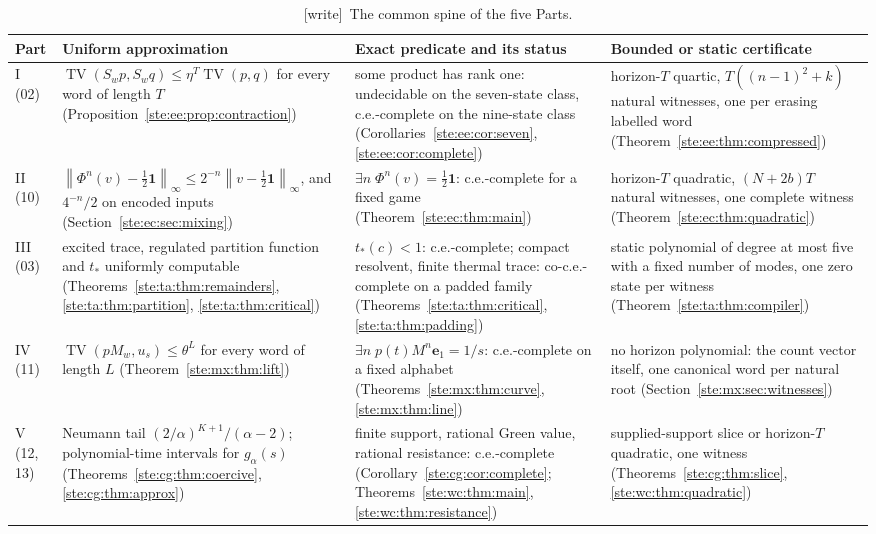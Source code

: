 \documentclass[11pt,letterpaper]{article}
\theoremstyle{definition}
\theoremstyle{remark}
\newcommand{\one}{\mathbf 1}
\newcommand{\TV}{\operatorname{TV}}
\newcommand{\norm}[1]{\left\lVert #1\right\rVert}
\newcommand{\e}{\mathbf e}
\newcommand{\wtag}{\textup{[write]}}
\begin{document}
\begin{table}[ht]
\centering\small
\begin{tabular}{@{}L{0.09\textwidth}L{0.27\textwidth}L{0.27\textwidth}L{0.29\textwidth}@{}}
\toprule
Part & Uniform approximation & Exact predicate and its status & Bounded or static certificate\\
\midrule
I (02) & $\TV(S_wp,S_wq)\le\eta^T\TV(p,q)$ for every word of length $T$ (Proposition~\ref{ste:ee:prop:contraction}) & some product has rank one: undecidable on the seven-state class, c.e.-complete on the nine-state class (Corollaries~\ref{ste:ee:cor:seven}, \ref{ste:ee:cor:complete}) & horizon-$T$ quartic, $T((n-1)^2+k)$ natural witnesses, one per erasing labelled word (Theorem~\ref{ste:ee:thm:compressed})\\
\addlinespace
II (10) & $\norm{\Phi^n(v)-\tfrac12\one}_\infty\le2^{-n}\norm{v-\tfrac12\one}_\infty$, and $4^{-n}/2$ on encoded inputs (Section~\ref{ste:ec:sec:mixing}) & $\exists n\;\Phi^n(v)=\tfrac12\one$: c.e.-complete for a fixed game (Theorem~\ref{ste:ec:thm:main}) & horizon-$T$ quadratic, $(N+2b)T$ natural witnesses, one complete witness (Theorem~\ref{ste:ec:thm:quadratic})\\
\addlinespace
III (03) & excited trace, regulated partition function and $t_*$ uniformly computable (Theorems~\ref{ste:ta:thm:remainders}, \ref{ste:ta:thm:partition}, \ref{ste:ta:thm:critical}) & $t_*(c)<1$: c.e.-complete; compact resolvent, finite thermal trace: co-c.e.-complete on a padded family (Theorems~\ref{ste:ta:thm:critical}, \ref{ste:ta:thm:padding}) & static polynomial of degree at most five with a fixed number of modes, one zero state per witness (Theorem~\ref{ste:ta:thm:compiler})\\
\addlinespace
IV (11) & $\TV(pM_w,u_s)\leq\theta^L$ for every word of length $L$ (Theorem~\ref{ste:mx:thm:lift}) & $\exists n\;p(t)M^n\e_1=1/s$: c.e.-complete on a fixed alphabet (Theorems~\ref{ste:mx:thm:curve}, \ref{ste:mx:thm:line}) & no horizon polynomial: the count vector itself, one canonical word per natural root (Section~\ref{ste:mx:sec:witnesses})\\
\addlinespace
V (12, 13) & Neumann tail $(2/\alpha)^{K+1}/(\alpha-2)$; polynomial-time intervals for $g_\alpha(s)$ (Theorems~\ref{ste:cg:thm:coercive}, \ref{ste:cg:thm:approx}) & finite support, rational Green value, rational resistance: c.e.-complete (Corollary~\ref{ste:cg:cor:complete}; Theorems~\ref{ste:wc:thm:main}, \ref{ste:wc:thm:resistance}) & supplied-support slice or horizon-$T$ quadratic, one witness (Theorems~\ref{ste:cg:thm:slice}, \ref{ste:wc:thm:quadratic})\\
\bottomrule
\end{tabular}
\caption{\wtag\ The common spine of the five Parts.}\label{ste:tab:spine}
\end{table}
\end{document}
